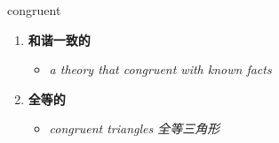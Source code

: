 
\begin{frame}
{\huge congruent}
\begin{center}
\begin{enumerate}\Large
  \item \textbf{和谐一致的}
  \begin{itemize}
    \item \em{\Large{a theory that congruent with known facts}}
  \end{itemize}
  \item \textbf{全等的}
  \begin{itemize}
    \item \em{\Large{congruent triangles 全等三角形}}
  \end{itemize}
\end{enumerate}
\end{center}
\end{frame}
